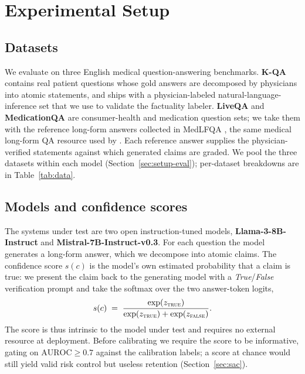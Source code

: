 
\section{Experimental Setup}
\label{sec:setup-exp}

\subsection{Datasets}
\label{sec:datasets}
We evaluate on three English medical question-answering benchmarks. \textbf{K-QA}
\citep{manes2024kqa} contains real patient questions whose gold answers are
decomposed by physicians into atomic statements, and ships with a physician-labeled
natural-language-inference set that we use to validate the factuality labeler.
\textbf{LiveQA} \citep{abacha2017liveqa} and \textbf{MedicationQA}
\citep{abacha2019medicationqa} are consumer-health and medication question sets; we
take them with the reference long-form answers collected in MedLFQA
\citep{jeong2024olaph}, the same medical long-form QA resource used by
\citet{cherian2024llm}. Each reference answer supplies the physician-verified
statements against which generated claims are graded. We pool the three datasets
within each model (Section~\ref{sec:setup-eval}); per-dataset breakdowns are in
Table~\ref{tab:data}.

\subsection{Models and confidence scores}
\label{sec:models}
The systems under test are two open instruction-tuned models,
\textbf{Llama-3-8B-Instruct} and \textbf{Mistral-7B-Instruct-v0.3}. For each
question the model generates a long-form answer, which we decompose into atomic
claims. The confidence score $s(c)$ is the model's own estimated probability that a
claim is true: we present the claim back to the generating model with a
\emph{True}/\emph{False} verification prompt and take the softmax over the two
answer-token logits,
\begin{equation}
s(c) \;=\; \frac{\exp(z_{\textsc{true}})}
{\exp(z_{\textsc{true}}) + \exp(z_{\textsc{false}})}.
\label{eq:ptrue}
\end{equation}
The score is thus intrinsic to the model under test and requires no external
resource at deployment. Before calibrating we require the score to be informative,
gating on $\mathrm{AUROC} \ge 0.7$ against the calibration labels; a score at chance
would still yield valid risk control but useless retention (Section~\ref{sec:sac}).

